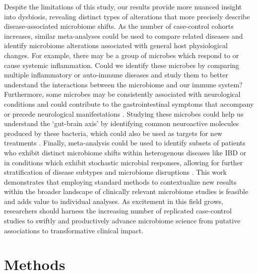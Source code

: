 \documentclass{article}
\begin{document}
Despite the limitations of this study, our results provide more nuanced insight into dysbiosis, revealing distinct types of alterations that more precisely describe disease-associated microbiome shifts.
As the number of case-control cohorts increases, similar meta-analyses could be used to compare related diseases and identify microbiome alterations associated with general host physiological changes.
For example, there may be a group of microbes which respond to or cause systemic inflammation.
Could we identify these microbes by comparing multiple inflammatory or auto-immune diseases and study them to better understand the interactions between the microbiome and our immune system? 
Furthermore, some microbes may be consistently associated with neurological conditions and could contribute to the gastrointestinal symptoms that accompany or precede neurological manifestations \cite{asd-kb,par-schep}.
Studying these microbes could help us understand the `gut-brain axis' by identifying common neuroactive molecules produced by these bacteria, which could also be used as targets for new treatments \cite{Hsiao2013gutbrain,Cryan2012gutbrain,Poutahidis2013gutbrain}.
Finally, meta-analysis could be used to identify subsets of patients who exhibit distinct microbiome shifts within heterogenous diseases like IBD or in conditions which exhibit stochastic microbial responses, allowing for further stratification of disease subtypes and microbiome disruptions \cite{zaneveld2017karenina,ibd-engstrand,Pascal2017crohns}.
This work demonstrates that employing standard methods to contextualize new results within the broader landscape of clinically relevant microbiome studies is feasible and adds value to individual analyses.
As excitement in this field grows, researchers should harness the increasing number of replicated case-control studies to swiftly and productively advance microbiome science from putative associations to transformative clinical impact. 


\section*{Methods}
\end{document}
